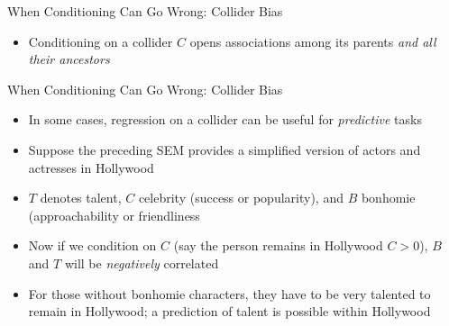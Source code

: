 \documentclass[aspectratio=1610,12pt,xcolor=dvipsnames]{beamer}
\begin{document}
\begin{frame}{When Conditioning Can Go Wrong: Collider Bias}

\begin{itemize}
    \item Conditioning on a collider $C$ opens associations among its parents \textit{and all their ancestors}
\end{itemize}

\centering
{}
\end{frame}

\begin{frame}{When Conditioning Can Go Wrong: Collider Bias}

\begin{itemize}
    \item In some cases, regression on a collider can be useful for \textit{predictive} tasks
    \item Suppose the preceding SEM provides a simplified version of actors and actresses in Hollywood
    \item $T$ denotes talent, $C$ celebrity (success or popularity), and $B$ bonhomie (approachability or friendliness
    \item Now if we condition on $C$ (say the person remains in Hollywood $C>0$), $B$ and $T$ will be \textit{negatively} correlated
    \item For those without bonhomie characters, they have to be very talented to remain in Hollywood; a prediction of talent is possible within Hollywood
\end{itemize}
\end{frame}
\end{document}
